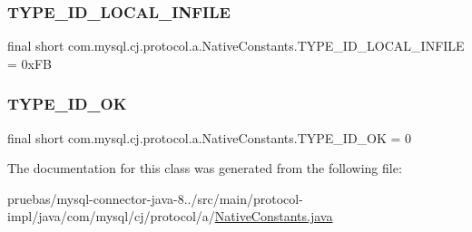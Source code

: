 \subsubsection{\texorpdfstring{T\+Y\+P\+E\+\_\+\+I\+D\+\_\+\+L\+O\+C\+A\+L\+\_\+\+I\+N\+F\+I\+LE}{TYPE\_ID\_LOCAL\_INFILE}}
{\footnotesize\ttfamily final short com.\+mysql.\+cj.\+protocol.\+a.\+Native\+Constants.\+T\+Y\+P\+E\+\_\+\+I\+D\+\_\+\+L\+O\+C\+A\+L\+\_\+\+I\+N\+F\+I\+LE = 0x\+FB\hspace{0.3cm}{\ttfamily [static]}}

\mbox{\label{classcom_1_1mysql_1_1cj_1_1protocol_1_1a_1_1_native_constants_a5dfab3c89b660796ea9d7ff15d59efb8}} 
\subsubsection{\texorpdfstring{T\+Y\+P\+E\+\_\+\+I\+D\+\_\+\+OK}{TYPE\_ID\_OK}}
{\footnotesize\ttfamily final short com.\+mysql.\+cj.\+protocol.\+a.\+Native\+Constants.\+T\+Y\+P\+E\+\_\+\+I\+D\+\_\+\+OK = 0\hspace{0.3cm}{\ttfamily [static]}}



The documentation for this class was generated from the following file\+:\begin{DoxyCompactItemize}
\item 
pruebas/mysql-\/connector-\/java-\/8../src/main/protocol-\/impl/java/com/mysql/cj/protocol/a/\mbox{\hyperlink{_native_constants_8java}{Native\+Constants.\+java}}\end{DoxyCompactItemize}
